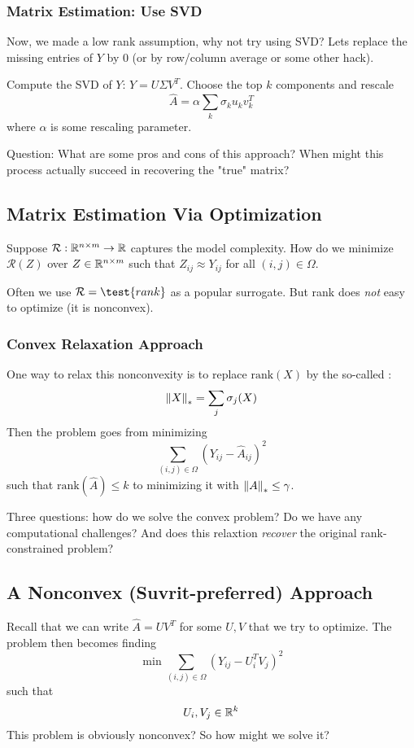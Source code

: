 \documentclass[11pt]{scrartcl}
\begin{document}
\subsubsection{Matrix Estimation: Use SVD}
Now, we made a low rank assumption, why not try using SVD? Lets replace the missing entries of $Y$ by $0$ (or by row/column average or some other hack).

Compute the SVD of $Y$: $Y=U\Sigma V^{T}$. Choose the top $k$ components and rescale $$\hat{A}=\alpha\sum_{k}\sigma_k u_k v_{k}^{T}$$ where $\alpha$ is some rescaling parameter. 

Question: What are some pros and cons of this approach? When might this process actually succeed in recovering the "true" matrix? 

\subsection{Matrix Estimation Via Optimization}
Suppose $\mathcal{R}:\mathbb{R}^{n \times m} \to \mathbb{R}$ captures the model complexity. How do we minimize $\mathcal{R}(Z)$ over $Z \in \mathbb{R}^{n \times m}$ such that $Z_{ij} \approx Y_{ij}$ for all $(i,j) \in \Omega$. 

Often we use $\mathcal{R}=\test{rank}$ as a popular surrogate. But rank does \textit{not} easy to optimize (it is nonconvex). 

\subsubsection{Convex Relaxation Approach}
One way to relax this nonconvexity is to replace $\text{rank}(X)$ by the so-called : $$\left\lVert X\right\rVert_*=\sum_{j}\sigma_{j}(X)$$ 
Then the problem goes from minimizing $$\sum_{(i,j) \in \Omega}(Y_{ij}-\hat{A}_{ij})^2$$ such that $\text{rank}(\hat{A}) \le k$ to minimizing it with $\left\lVert A\right\rVert_* \le \gamma$. 

Three questions: how do we solve the convex problem? Do we have any computational challenges? And does this relaxtion \textit{recover} the original rank-constrained problem?

\subsection{A Nonconvex (Suvrit-preferred) Approach}
Recall that we can write $\hat{A}=UV^{T}$ for some $U,V$ that we try to optimize. The problem then becomes finding $$\min \sum_{(i,j) \in \Omega}(Y_{ij}-U_{i}^{T}V_j)^2$$ such that $$U_i,V_j \in \mathbb{R}^{k}$$
This problem is obviously nonconvex? So how might we solve it?
\end{document}
